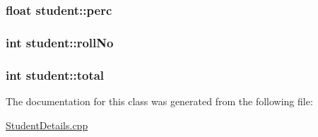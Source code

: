\subsubsection[{\texorpdfstring{perc}{perc}}]{\setlength{\rightskip}{0pt plus 5cm}float student\+::perc\hspace{0.3cm}{\ttfamily [private]}}\hypertarget{classstudent_a63ba5c58c9d2bfe2c7f3128eb0222637}{}\label{classstudent_a63ba5c58c9d2bfe2c7f3128eb0222637}
\subsubsection[{\texorpdfstring{roll\+No}{rollNo}}]{\setlength{\rightskip}{0pt plus 5cm}int student\+::roll\+No\hspace{0.3cm}{\ttfamily [private]}}\hypertarget{classstudent_aba65fad741cdd2d47b62592e0a02aa05}{}\label{classstudent_aba65fad741cdd2d47b62592e0a02aa05}
\subsubsection[{\texorpdfstring{total}{total}}]{\setlength{\rightskip}{0pt plus 5cm}int student\+::total\hspace{0.3cm}{\ttfamily [private]}}\hypertarget{classstudent_a036cbac5ccbb235fdc3313cb7806e199}{}\label{classstudent_a036cbac5ccbb235fdc3313cb7806e199}


The documentation for this class was generated from the following file\+:\begin{DoxyCompactItemize}
\item 
\hyperlink{StudentDetails_8cpp}{Student\+Details.\+cpp}\end{DoxyCompactItemize}
